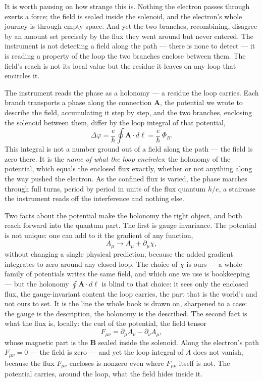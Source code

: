 It is worth pausing on how strange this is. Nothing the electron passes through exerts a force; the field is
sealed inside the solenoid, and the electron's whole journey is through empty space. And yet the two branches,
recombining, disagree by an amount set precisely by the flux they went around but never entered. The
instrument is not detecting a field along the path --- there is none to detect --- it is reading a property of
the loop the two branches enclose between them. The field's reach is not its local value but the residue it
leaves on any loop that encircles it.

The instrument reads the phase as a holonomy --- a residue the loop carries. Each branch transports a phase
along the connection $\mathbf{A}$, the potential we wrote to describe the field, accumulating it step by step,
and the two branches, enclosing the solenoid between them, differ by the loop integral of that potential,
\begin{equation}
  \Delta\varphi = \frac{e}{\hbar}\oint \mathbf{A}\cdot d\boldsymbol{\ell} = \frac{e}{\hbar}\,\Phi_B .
\end{equation}
This integral is not a number ground out of a field along the path --- the field is zero there. It is the
\emph{name of what the loop encircles}: the holonomy of the potential, which equals the enclosed flux exactly,
whether or not anything along the way pushed the electron. As the confined flux is varied, the phase marches
through full turns, period by period in units of the flux quantum $h/e$, a staircase the instrument reads off
the interference and nothing else.

Two facts about the potential make the holonomy the right object, and both reach forward into the quantum
part. The first is gauge invariance. The potential is not unique: one can add to it the gradient of any
function,
\begin{equation}
  A_\mu \to A_\mu + \partial_\mu \chi,
\end{equation}
without changing a single physical prediction, because the added gradient integrates to zero around any closed
loop. The choice of $\chi$ is ours --- a whole family of potentials writes the same field, and which one we use
is bookkeeping --- but the holonomy $\oint \mathbf{A}\cdot d\boldsymbol{\ell}$ is blind to that choice: it sees
only the enclosed flux, the gauge-invariant content the loop carries, the part that is the world's and not ours
to set. It is the line the whole book is drawn on, sharpened to a case: the gauge is the description, the
holonomy is the described. The second fact is what the flux is, locally:
the curl of the potential, the field tensor
\begin{equation}
  F_{\mu\nu} = \partial_\mu A_\nu - \partial_\nu A_\mu,
\end{equation}
whose magnetic part is the $\mathbf{B}$ sealed inside the solenoid. Along the electron's path $F_{\mu\nu} = 0$
--- the field is zero --- and yet the loop integral of $A$ does not vanish, because the flux $F_{\mu\nu}$
encloses is nonzero even where $F_{\mu\nu}$ itself is not. The potential carries, around the loop, what the
field hides inside it.


